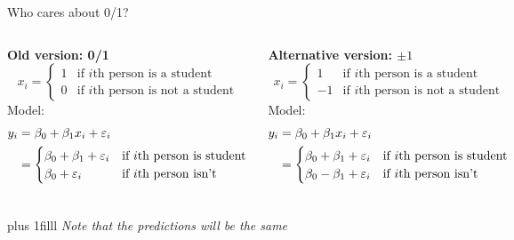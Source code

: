 \documentclass[aspectratio=169,usenames,dvipsnames]{beamer}
\newcommand{\InstructorNotes}[1]{\textit{\color{orange}#1}}
\newcommand{\bvfill}{\vskip0pt plus 1filll}
\begin{document}
	\begin{frame}[t]{Who cares about 0/1?}
	
	\begin{columns}
		\textbf{Old version: 0/1}
	\begin{equation*}
			x_i =
		\begin{cases}
			1 & \text{if $i$th person is a student}\\
			0 & \text{if $i$th person is not a student}
		\end{cases}
	\end{equation*}
	Model:
	\begin{align*}
	y_i &= \beta_0 + \beta_1x_i+\varepsilon_i\\
	&= 
		\begin{cases}
			\beta_0 + \beta_1+\varepsilon_i	 & \text{if $i$th person is student}\\
			\beta_0 +\varepsilon_i & \text{if $i$th person isn't}
		\end{cases}
	\end{align*}
	
	\textbf{Alternative version: $\pm 1$}
	\begin{equation*}
			x_i =
		\begin{cases}
			1 & \text{if $i$th person is a student}\\
			-1 & \text{if $i$th person is not a student}
		\end{cases}
	\end{equation*}
	Model:
	\begin{align*}
	y_i &= \beta_0 + \beta_1x_i+\varepsilon_i\\
	&= 
		\begin{cases}
			\beta_0 + \beta_1+\varepsilon_i	 & \text{if $i$th person is student}\\
			\beta_0 - \beta_1+\varepsilon_i & \text{if $i$th person isn't}
		\end{cases}
	\end{align*}
	
	\end{columns}
	
	\bvfill
	\InstructorNotes{Note that the predictions will be the same}
	\end{frame}
	
\end{document}
